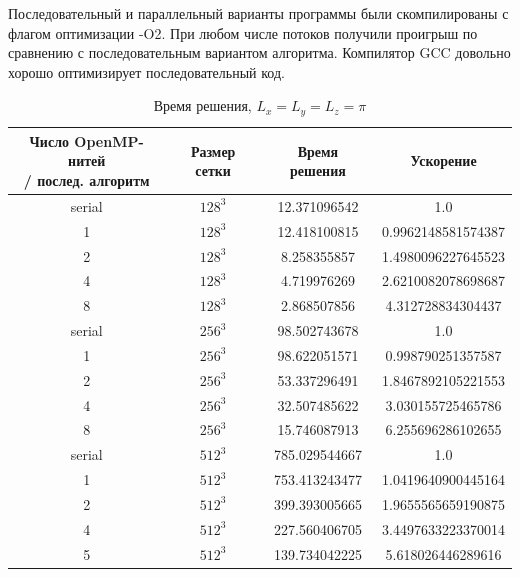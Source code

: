 \noindent
Последовательный и параллельный варианты программы были скомпилированы с флагом оптимизации -O2.
При любом числе потоков получили проигрыш по сравнению с последовательным вариантом алгоритма.
Компилятор GCC довольно хорошо оптимизирует последовательный код.

\begin{table}[ht]
    \begin{tabular}{|c|c|c|c|}
        \hline
        \makecell[c]{Число OpenMP-нитей\\ / послед. алгоритм} & Размер сетки & Время решения & Ускорение \\
        \hline
        serial & \(128^3\) & 12.371096542 & 1.0 \\
        1 & \(128^3\) & 12.418100815 & 0.9962148581574387 \\
        2 & \(128^3\) & 8.258355857 & 1.4980096227645523 \\
        4 & \(128^3\) & 4.719976269 & 2.6210082078698687 \\
        8 & \(128^3\) & 2.868507856 & 4.312728834304437 \\
        \hline
        serial & \(256^3\) & 98.502743678 & 1.0 \\
        1 & \(256^3\) & 98.622051571 & 0.998790251357587 \\
        2 & \(256^3\) & 53.337296491 & 1.8467892105221553 \\
        4 & \(256^3\) & 32.507485622 & 3.030155725465786 \\
        8 & \(256^3\) & 15.746087913 & 6.255696286102655 \\
        \hline
        serial & \(512^3\) & 785.029544667 & 1.0 \\
        1 & \(512^3\) & 753.413243477 & 1.0419640900445164 \\
        2 & \(512^3\) & 399.393005665 & 1.9655565659190875 \\
        4 & \(512^3\) & 227.560406705 & 3.4497633223370014 \\
        5 & \(512^3\) & 139.734042225 & 5.618026446289616 \\
        \hline
    \end{tabular}
    \caption{Время решения, \(L_x=L_y=L_z=\pi\)}
    \label{tab2}
\end{table}

